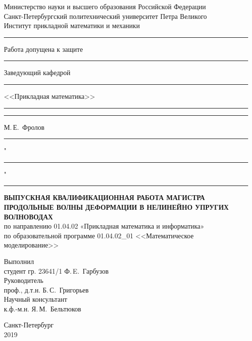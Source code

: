 \documentclass[12pt, a4paper]{report}
\begin{document}
\begin{titlepage}
	
	\begin{center}
		Министерство науки и высшего образования Российской Федерации\\
		Санкт-Петербургский политехнический университет Петра Великого\\
		Институт прикладной математики и механики
	\end{center}
	
	\vspace{3mm}
	
	\begin{flushleft}
		\rule{10cm}{0pt} {Работа допущена к защите}\\
		\rule{10cm}{0pt} Заведующий кафедрой\\
		\rule{10cm}{0pt} <<Прикладная математика>>\\
		\vspace{4mm}
		\rule{10cm}{0pt} \rule{3.6cm}{0.5pt} М.\,Е.~Фролов\\
		\vspace{2mm}
		\rule{10cm}{0pt} "\rule{0.8cm}{0.5pt}" \rule{5.05cm}{0.5pt}
	\end{flushleft}
	
	\vspace{10mm}
	
	\begin{center}
		{\bf ВЫПУСКНАЯ КВАЛИФИКАЦИОННАЯ РАБОТА МАГИСТРА}\\
		\vspace{5mm} 
		{\bf ПРОДОЛЬНЫЕ ВОЛНЫ ДЕФОРМАЦИИ В НЕЛИНЕЙНО УПРУГИХ ВОЛНОВОДАХ}\\
		\vspace{5mm}
		по направлению 01.04.02 «Прикладная математика и информатика»\\
		по образовательной программе 01.04.02\_01 <<Математическое моделирование>>
	\end{center}

	\begin{flushleft}
		\vspace{12mm}
		Выполнил\\
		студент гр. 23641/1 \hspace{90mm} Ф.\,E.~Гарбузов \\
		\vspace{6mm} Руководитель\\
		проф., д.т.н. \hspace{104mm} Б.\,С.~Григорьев\\
		\vspace{6mm} Научный консультант\\
		к.ф.-м.н. \hspace{109mm} Я.\,М.~Бельтюков\\
	\end{flushleft}
	
	\vspace{10mm}
	
	\begin{center}
		Санкт-Петербург\\2019
	\end{center}
	
\end{titlepage}
\end{document}
